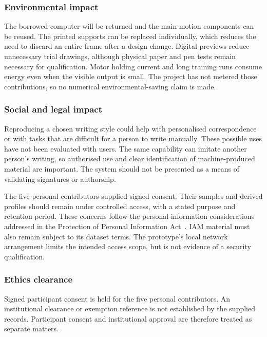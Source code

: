\subsubsection{Environmental impact}
The borrowed computer will be returned and the main motion components can be reused. The printed supports can be replaced individually, which reduces the need to discard an entire frame after a design change. Digital previews reduce unnecessary trial drawings, although physical paper and pen tests remain necessary for qualification. Motor holding current and long training runs consume energy even when the visible output is small. The project has not metered those contributions, so no numerical environmental-saving claim is made.

\subsubsection{Social and legal impact}
Reproducing a chosen writing style could help with personalised correspondence or with tasks that are difficult for a person to write manually. These possible uses have not been evaluated with users. The same capability can imitate another person's writing, so authorised use and clear identification of machine-produced material are important. The system should not be presented as a means of validating signatures or authorship.

The five personal contributors supplied signed consent. Their samples and derived profiles should remain under controlled access, with a stated purpose and retention period. These concerns follow the personal-information considerations addressed in the Protection of Personal Information Act~\cite[pp.~8--9, 11]{popia2013}. IAM material must also remain subject to its dataset terms. The prototype's local network arrangement limits the intended access scope, but is not evidence of a security qualification.

\subsubsection{Ethics clearance}
Signed participant consent is held for the five personal contributors. An institutional clearance or exemption reference is not established by the supplied records. Participant consent and institutional approval are therefore treated as separate matters.
\FloatBarrier
